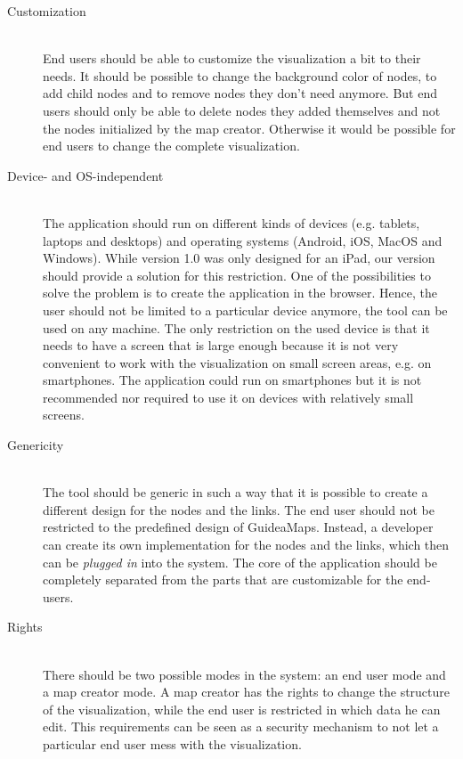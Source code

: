 \begin{description}
	
	\item[Customization] \hfill \\
	End users should be able to customize the visualization a bit to their needs. It should be possible to change the background color of nodes, to add child nodes and to remove nodes they don't need anymore. But end users should only be able to delete nodes they added themselves and not the nodes initialized by the map creator. Otherwise it would be possible for end users to change the complete visualization.

	\item[Device- and OS-independent] \hfill \\
	The application should run on different kinds of devices (e.g. tablets, laptops and desktops) and operating systems (Android, iOS, MacOS and Windows). While version 1.0 was only designed for an iPad, our version should provide a solution for this restriction. One of the possibilities to solve the problem is to create the application in the browser. Hence, the user should not be limited to a particular device anymore, the tool can be used on any machine. The only restriction on the used device is that it needs to have a screen that is large enough because it is not very convenient to work with the visualization on small screen areas, e.g. on smartphones. The application could run on smartphones but it is not recommended nor required to use it on devices with relatively small screens.
  
	\item[Genericity] \hfill \\
  The tool should be generic in such a way that it is possible to create a different design for the nodes and the links. The end user should not be restricted to the predefined design of GuideaMaps. Instead, a developer can create its own implementation for the nodes and the links, which then can be \textit{plugged in} into the system. The core of the application should be completely separated from the parts that are customizable for the end-users.
  
	\item[Rights] \hfill \\
	There should be two possible modes in the system: an end user mode and a map creator mode. A map creator has the rights to change the structure of the visualization, while the end user is restricted in which data he can edit. This requirements can be seen as a security mechanism to not let a particular end user mess with the visualization.
  

\end{description}
